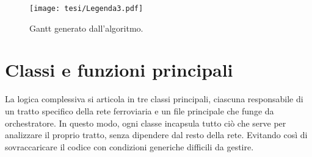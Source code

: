 \documentclass{report}
\begin{document}
    \begin{figure}[H]  %
  \centering
  \caption{Gantt generato dall'algoritmo.}
  \texttt{[image: tesi/Legenda3.pdf]}
  \label{fig:placeholder}
\end{figure}


\section{Classi e funzioni principali}
La logica complessiva si articola in tre classi principali, ciascuna responsabile di un tratto specifico della rete ferroviaria e un file principale che funge da orchestratore. In questo modo, ogni classe incapsula tutto ciò che serve per analizzare il proprio tratto, senza dipendere dal resto della rete. Evitando così di sovraccaricare il codice con condizioni generiche difficili da gestire.
\end{document}
